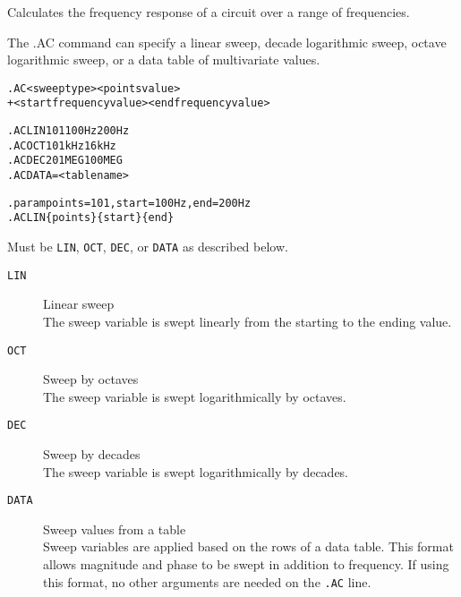 


Calculates the frequency response of a circuit over a range of frequencies.

The .AC command can specify a linear sweep, decade logarithmic sweep,
octave logarithmic sweep, or a data table of multivariate values.

\begin{Command}

\format
\begin{alltt}
.AC <sweep type> <points value>
+ <start frequency value> <end frequency value>
\end{alltt}

\examples
\begin{alltt}
.AC LIN 101 100Hz 200Hz
.AC OCT 10 1kHz 16kHz
.AC DEC 20 1MEG 100MEG
.AC DATA=<table name>

.param points=101, start=100Hz, end=200Hz
.AC LIN \{points\} \{start\}  \{end\}
\end{alltt}

\arguments

\begin{Arguments}

Must be \texttt{LIN}, \texttt{OCT}, \texttt{DEC}, or \texttt{DATA} as described below.
\begin{description}

\item[\tt LIN] Linear sweep\\
The sweep variable is swept linearly from the starting to the ending value.

\item[\tt OCT] Sweep by octaves\\
The sweep variable is swept logarithmically by octaves.

\item[\tt DEC] Sweep by decades\\
The sweep variable is swept logarithmically by decades.

\item[\tt DATA] Sweep values from a table\\
Sweep variables are applied based on the rows of a data table.  This format allows magnitude and phase to be swept in addition to frequency.    If using this format, no other arguments are needed on the \texttt{.AC} line.


\end{description}
\end{Arguments}
\end{Command}

